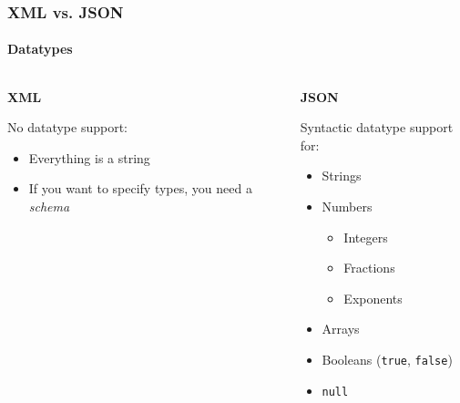 \documentclass[
    alternativetitlepage=alternativ,
    cornerlogo=hgi_nds_logo2,
    sectionoverview,
]{rubpresentation}
\begin{document}
\begin{frame}
    \frametitle{XML vs. JSON}
    \framesubtitle{Datatypes}
    \begin{columns}[t]
        \begin{column}{0.5\textwidth}
            \begin{center}\textbf{\Large XML}\end{center}
            No datatype support:
            \begin{itemize}
                \item{} Everything is a string\\
                \item{} If you want to specify types, you need a %
                        \emph{schema}\\
            \end{itemize}
        \end{column}
        \begin{column}{0.5\textwidth}
            \begin{center}\textbf{\Large JSON}\end{center}
            Syntactic datatype support for:
            \begin{itemize}
                \item{} Strings\\
                \item{} Numbers
                    \begin{itemize}
                        \item{} Integers\\
                        \item{} Fractions\\
                        \item{} Exponents\\
                    \end{itemize}
                \item{} Arrays
                \item{} Booleans (\texttt{true}, \texttt{false})\\
                \item{} \texttt{null}\\
            \end{itemize}
        \end{column}
    \end{columns}
\end{frame}
\end{document}
